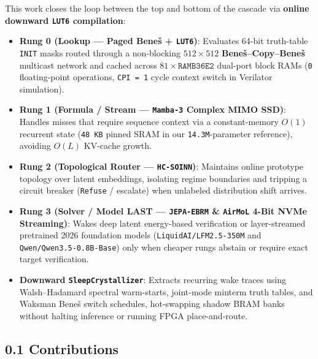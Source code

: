 \documentclass[10pt]{article}
\begin{document}
This work closes the loop between the top and bottom of the cascade via \textbf{online downward \texttt{LUT6} compilation}:
\begin{itemize}
  \item \textbf{Rung 0 (Lookup --- Paged Bene\v{s} + \texttt{LUT6})}: Evaluates 64-bit truth-table \texttt{INIT} masks routed through a non-blocking $512 \times 512$ \textbf{Bene\v{s}--Copy--Bene\v{s}} multicast network and cached across $81 \times \texttt{RAMB36E2}$ dual-port block RAMs (\texttt{0} floating-point operations, \texttt{CPI = 1} cycle context switch in Verilator simulation).
  \item \textbf{Rung 1 (Formula / Stream --- \texttt{Mamba-3} Complex MIMO SSD)}: Handles misses that require sequence context via a constant-memory $O(1)$ recurrent state (\texttt{48 KB} pinned SRAM in our \texttt{14.3M}-parameter reference), avoiding $O(L)$ KV-cache growth.
  \item \textbf{Rung 2 (Topological Router --- \texttt{HC-SOINN})}: Maintains online prototype topology over latent embeddings, isolating regime boundaries and tripping a circuit breaker (\texttt{Refuse} / escalate) when unlabeled distribution shift arrives.
  \item \textbf{Rung 3 (Solver / Model LAST --- \texttt{JEPA-EBRM} \& \texttt{AirMoL} 4-Bit NVMe Streaming)}: Wakes deep latent energy-based verification or layer-streamed pretrained 2026 foundation models (\texttt{LiquidAI/LFM2.5-350M} and \texttt{Qwen/Qwen3.5-0.8B-Base}) only when cheaper rungs abstain or require exact target verification.
  \item \textbf{Downward \texttt{SleepCrystallizer}}: Extracts recurring wake traces using Walsh--Hadamard spectral warm-starts, joint-mode minterm truth tables, and Waksman Bene\v{s} switch schedules, hot-swapping shadow BRAM banks without halting inference or running FPGA place-and-route.
\end{itemize}

\subsection{0.1 Contributions}\label{contributions}
\end{document}
